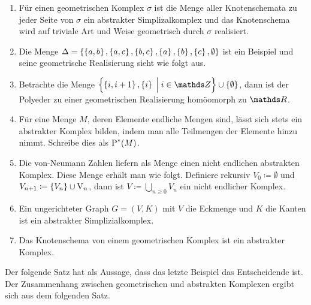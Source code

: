 \begin{Bsp}
  \begin{enumerate}[\textbullet]
  \item Für einen geometrischen Komplex $\sigma$ ist die Menge aller
    Knotenschemata zu jeder Seite von $\sigma$ ein abstrakter
    Simplizalkomplex und das Knotenschema wird auf triviale Art und
    Weise geometrisch durch $\sigma$ realisiert.
  \item Die Menge $\Delta = \sset{%
      \sset{a,b},\sset{a,c},%
      \sset{b,c},\sset{a},\sset{b},\sset{c},\emptyset}$ ist ein Beispiel und 
    seine geometrische Realisierung sieht wie folgt aus.
    \begin{center}
    \end{center}

  \item Betrachte die Menge
    $\set{ \sset{i,i+1} , \sset{i} }{ i \in \Z} \cup \sset{\emptyset}$,
    dann ist der Polyeder zu einer geometrischen Realisierung
    homöomorph zu $\R$.

  \item Für eine Menge $M$, deren Elemente endliche Mengen sind, lässt
    sich stets ein abstrakter Komplex bilden, indem man alle
    Teilmengen der Elemente hinzu nimmt. Schreibe dies als
    $\operatorname{P}^*(M)$.

  \item Die von-Neumann Zahlen liefern als Menge einen nicht endlichen
    abstrakten Komplex.  Diese Menge erhält man wie folgt. Definiere
    rekursiv $V_0 \coloneqq \emptyset$ und
    $V_{n+1} \coloneqq \left\{ V_n \right\} \cup \operatorname{V}_n$, dann ist
    $V \coloneqq \bigcup\limits_{n \geq 0} V_n$ ein nicht endlicher
    Komplex.
  \item Ein ungerichteter Graph $G=(V,K)$ mit $V$ die Eckmenge und $K$
    die Kanten ist ein abstrakter Simplizialkomplex.
  \item Das Knotenschema von einem geometrischen Komplex ist ein
    abstrakter Komplex.
  \end{enumerate}
\end{Bsp}

Der folgende Satz hat als Aussage, dass das letzte Beispiel das
Entscheidende ist. Der Zusammenhang zwischen geometrischen und
abstrakten Komplexen ergibt sich aus dem folgenden Satz.


